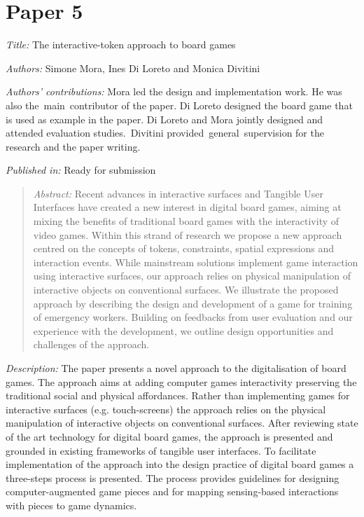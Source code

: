 \section[P5: The interactive-token approach to board games]{Paper 5}\label{paper-5}

\emph{Title:} The interactive-token approach to board games

\emph{Authors:} Simone Mora, Ines Di Loreto and Monica Divitini

\emph{Authors' contributions:} Mora led the design and implementation work. He was also the~main~contributor of the paper. Di Loreto designed the board game that is used as example in the paper. Di Loreto and Mora jointly designed and attended evaluation studies.~Divitini provided~general~supervision for the research and the paper writing.

\emph{Published in:} Ready for submission 
\begin{quote}
	\emph{Abstract:} Recent advances in interactive surfaces and Tangible User Interfaces have created a new interest in digital board games, aiming at mixing the benefits of traditional board games with the interactivity of video games. Within this strand of research we propose a new approach centred on the concepts of tokens, constraints, spatial expressions and interaction events. While mainstream solutions implement game interaction using interactive surfaces, our approach relies on physical manipulation of interactive objects on conventional surfaces. We illustrate the proposed approach by describing the design and development of a game for training of emergency workers. Building on feedbacks from user evaluation and our experience with the development, we outline design opportunities and challenges of the approach. 
\end{quote}

\emph{Description:} The paper presents a novel approach to the digitalisation of board games. The approach aims at adding computer games interactivity preserving the traditional social and physical affordances. Rather than implementing games for interactive surfaces (e.g. touch-screens) the approach relies on the physical manipulation of interactive objects on conventional surfaces. After reviewing state of the art technology for digital board games, the approach is presented and grounded in existing frameworks of tangible user interfaces. To facilitate implementation of the approach into the design practice of digital board games a three-steps process is presented. The process provides guidelines for designing computer-augmented game pieces and for mapping sensing-based interactions with pieces to game dynamics.

